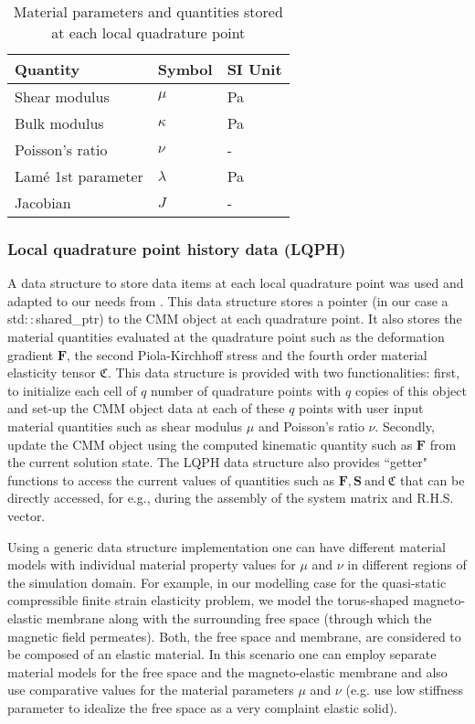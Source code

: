 \begin{table}[ht]
\centering
\begin{tabular}[c]{|C{4cm}|C{2cm}|C{2cm}|}
\hline
\textbf{Quantity} & \textbf{Symbol} & \textbf{SI Unit} \\
\hline
Shear modulus & $\mu$ & Pa \\
\hline
Bulk modulus & $\kappa$ & Pa \\
\hline
Poisson's ratio & $\nu$ & - \\
\hline
Lam\'e 1st parameter & $\lambda$ & Pa \\
\hline 
Jacobian & $J$ & - \\
\hline 
\end{tabular} 
\caption{Material parameters and quantities stored at each local quadrature point}
\label{tab:2.1}
\end{table}

\subsubsection{Local quadrature point history data (LQPH)}
A data structure to store data items at each local quadrature point was used and adapted to our needs from \cite{Pelteret2012}. This data structure stores a pointer (in our case a std$::$shared\_ptr) to the CMM object at each quadrature point. It also stores the material quantities evaluated at the quadrature point such as the deformation gradient $\mathbf{F}$, the second Piola-Kirchhoff stress and the fourth order material elasticity tensor $\mathfrak{C}$. This data structure is provided with two functionalities: first, to initialize each cell of $q$ number of quadrature points with $q$ copies of this object and set-up the CMM object data at each of these $q$ points with user input material quantities such as shear modulus $\mu$ and Poisson's ratio $\nu$. Secondly, update the CMM object using the computed kinematic quantity such as $\mathbf{F}$ from the current solution state. The LQPH data structure also provides ``getter" functions to access the current values of quantities such as $\mathbf{F}, \mathbf{S} \ \text{and} \ \mathfrak{C}$ that can be directly accessed, for e.g., during the assembly of the system matrix and R.H.S. vector.\par 
Using a generic data structure implementation one can have different material models with individual material property values for $\mu$ and $\nu$ in different regions of the simulation domain. For example, in our modelling case for the quasi-static compressible finite strain elasticity problem, we model the torus-shaped magneto-elastic membrane along with the surrounding free space (through which the magnetic field permeates). Both, the free space and membrane, are considered to be composed of an elastic material. In this scenario one can employ separate material models for the free space and the magneto-elastic membrane and also use comparative values for the material parameters $\mu$ and $\nu$ (e.g. use low stiffness parameter to idealize the free space as a very complaint elastic solid). 

